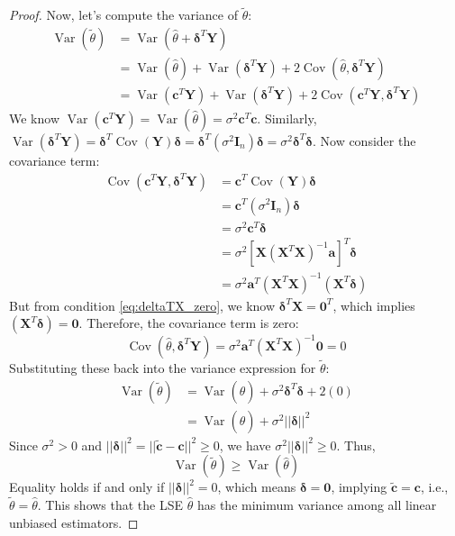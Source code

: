 \documentclass[11pt]{article}
\theoremstyle{mytheoremstyle}
\theoremstyle{mydefinitionstyle}
\newcommand{\vect}[1]{\mathbf{#1}}
\DeclareMathOperator{\Var}{Var}
\DeclareMathOperator{\Cov}{Cov}
\begin{document}
\begin{proof}
Now, let's compute the variance of $\tilde{\theta}$:
\begin{align*}
\Var(\tilde{\theta}) &= \Var(\hat{\theta} + \vect{\delta}^T \vect{Y}) \\
&= \Var(\hat{\theta}) + \Var(\vect{\delta}^T \vect{Y}) + 2 \Cov(\hat{\theta}, \vect{\delta}^T \vect{Y}) \\
&= \Var(\vect{c}^T \vect{Y}) + \Var(\vect{\delta}^T \vect{Y}) + 2 \Cov(\vect{c}^T \vect{Y}, \vect{\delta}^T \vect{Y})
\end{align*}
We know $\Var(\vect{c}^T \vect{Y}) = \Var(\hat{\theta}) = \sigma^2 \vect{c}^T \vect{c}$.
Similarly, $\Var(\vect{\delta}^T \vect{Y}) = \vect{\delta}^T \Cov(\vect{Y}) \vect{\delta} = \vect{\delta}^T (\sigma^2 \vect{I}_n) \vect{\delta} = \sigma^2 \vect{\delta}^T \vect{\delta}$.
Now consider the covariance term:
\begin{align*}
\Cov(\vect{c}^T \vect{Y}, \vect{\delta}^T \vect{Y}) &= \vect{c}^T \Cov(\vect{Y}) \vect{\delta} \\
&= \vect{c}^T (\sigma^2 \vect{I}_n) \vect{\delta} \\
&= \sigma^2 \vect{c}^T \vect{\delta} \\
&= \sigma^2 [\vect{X} (\vect{X}^T \vect{X})^{-1} \vect{a}]^T \vect{\delta} \\
&= \sigma^2 \vect{a}^T (\vect{X}^T \vect{X})^{-1} (\vect{X}^T \vect{\delta})
\end{align*}
But from condition \eqref{eq:deltaTX_zero}, we know $\vect{\delta}^T \vect{X} = \vect{0}^T$, which implies $(\vect{X}^T \vect{\delta}) = \vect{0}$. Therefore, the covariance term is zero:
\begin{equation*}
\Cov(\hat{\theta}, \vect{\delta}^T \vect{Y}) = \sigma^2 \vect{a}^T (\vect{X}^T \vect{X})^{-1} \vect{0} = 0
\end{equation*}
Substituting these back into the variance expression for $\tilde{\theta}$:
\begin{align*}
\Var(\tilde{\theta}) &= \Var(\hat{\theta}) + \sigma^2 \vect{\delta}^T \vect{\delta} + 2(0) \\
&= \Var(\hat{\theta}) + \sigma^2 ||\vect{\delta}||^2
\end{align*}
Since $\sigma^2 > 0$ and $||\vect{\delta}||^2 = ||\tilde{\vect{c}} - \vect{c}||^2 \ge 0$, we have $\sigma^2 ||\vect{\delta}||^2 \ge 0$.
Thus,
\begin{equation*}
\Var(\tilde{\theta}) \ge \Var(\hat{\theta})
\end{equation*}
Equality holds if and only if $||\vect{\delta}||^2 = 0$, which means $\vect{\delta} = \vect{0}$, implying $\tilde{\vect{c}} = \vect{c}$, i.e., $\tilde{\theta} = \hat{\theta}$.
This shows that the LSE $\hat{\theta}$ has the minimum variance among all linear unbiased estimators.
\end{proof}
\end{document}
